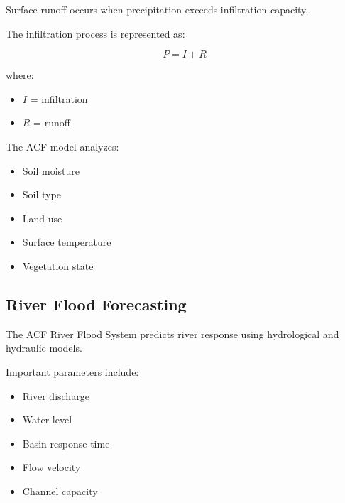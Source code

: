 Surface runoff occurs when precipitation exceeds infiltration capacity.

The infiltration process is represented as:

\[
P=I+R
\]

where:

\begin{itemize}

\item $I$ = infiltration

\item $R$ = runoff

\end{itemize}


The ACF model analyzes:

\begin{itemize}

\item Soil moisture

\item Soil type

\item Land use

\item Surface temperature

\item Vegetation state

\end{itemize}



\subsection{River Flood Forecasting}

The ACF River Flood System predicts river response using hydrological
and hydraulic models.

Important parameters include:

\begin{itemize}

\item River discharge

\item Water level

\item Basin response time

\item Flow velocity

\item Channel capacity

\end{itemize}


